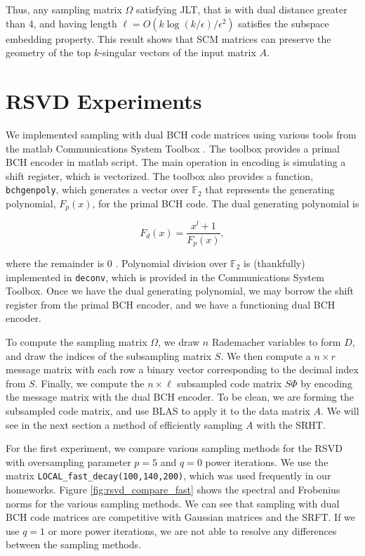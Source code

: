 \documentclass[12pt]{article}
\begin{document}
Thus, any sampling matrix $\Omega$ satisfying JLT, that is with dual distance greater than 4, and having length $\ell  = O(k \log(k / \epsilon) / \epsilon^2)$ satisfies the subspace embedding property. This result shows that SCM matrices can preserve the geometry of the top $k$-singular vectors of the input matrix $A$.



\section{RSVD Experiments}
We implemented sampling with dual BCH code matrices using various tools from the {\sc matlab} Communications System Toolbox \cite{matlab_cst_2015}.  The toolbox provides a primal BCH encoder in {\sc matlab} script.  The main operation in encoding is simulating a shift register, which is vectorized.  The toolbox also provides a function, \texttt{bchgenpoly}, which generates a vector over $\mathbb{F}_2$ that represents the generating polynomial, $F_p(x)$, for the primal BCH code.  The dual generating polynomial is 

\[ F_d(x) = \dfrac{x^l+1}{F_p(x)}, \] 

\noindent where the remainder is $0$ \cite{hall2003notes}.  Polynomial division over $\mathbb{F}_2$ is (thankfully) implemented in \texttt{deconv}, which is provided in the Communications System Toolbox.  Once we have the dual generating polynomial, we may borrow the shift register from the primal BCH encoder, and we have a functioning dual BCH encoder.

To compute the sampling matrix $\Omega$, we draw $n$ Rademacher variables to form $D$, and draw the indices of the subsampling matrix $S$.  We then compute a $n\times r$ message matrix with each row a binary vector corresponding to the decimal index from $S$.  Finally, we compute the $n\times \ell$ subsampled code matrix $S\Phi$ by encoding the message matrix with the dual BCH encoder.  To be clean, we are forming the subsampled code matrix, and use BLAS to apply it to the data matrix $A$.  We will see in the next section a method of efficiently sampling $A$ with the SRHT.

For the first experiment, we compare various sampling methods for the RSVD with oversampling parameter $p=5$ and $q=0$ power iterations.  We use the matrix \verb|LOCAL_fast_decay(100,140,200)|, which was used frequently in our homeworks.  Figure \ref{fig:rsvd_compare_fast} shows the spectral and Frobenius norms for the various sampling methods.  We can see that sampling with dual BCH code matrices are competitive with Gaussian matrices and the SRFT.  If we use $q=1$ or more power iterations, we are not able to resolve any differences between the sampling methods.
\end{document}

